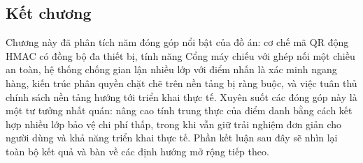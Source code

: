 \documentclass[../main.tex]{subfiles}
\begin{document}
\subsection*{Kết chương}

Chương này đã phân tích năm đóng góp nổi bật của đồ án: cơ chế mã QR động HMAC có đồng bộ đa
thiết bị, tính năng Cổng máy chiếu với ghép nối một chiều an toàn, hệ thống chống gian lận
nhiều lớp với điểm nhấn là xác minh ngang hàng, kiến trúc phân quyền chặt chẽ trên nền tảng bị
ràng buộc, và việc tuân thủ chính sách nền tảng hướng tới triển khai thực tế. Xuyên suốt các
đóng góp này là một tư tưởng nhất quán: nâng cao tính trung thực của điểm danh bằng cách kết
hợp nhiều lớp bảo vệ chi phí thấp, trong khi vẫn giữ trải nghiệm đơn giản cho người dùng và
khả năng triển khai thực tế. Phần kết luận sau đây sẽ nhìn lại toàn bộ kết quả và bàn về các
định hướng mở rộng tiếp theo.
\end{document}
